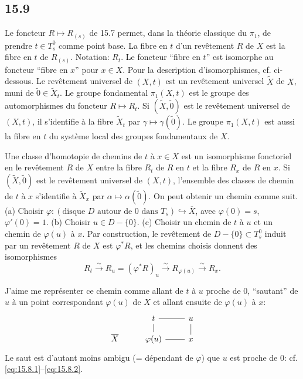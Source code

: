 \documentclass[12pt,a4paper]{article}
\theoremstyle{plain}
\theoremstyle{definition}
\theoremstyle{remark}
\begin{document}
\subsection*{15.9}

Le foncteur $R \mapsto R_{(s)}$ de 15.7 permet, dans la théorie classique du $\pi_1$, de prendre $t \in T_s^0$ comme point base. La fibre en $t$ d'un revêtement $R$ de $X$ est la fibre en $t$ de $R_{(s)}$. Notation: $R_t$. Le foncteur ``fibre en $t$'' est isomorphe au foncteur ``fibre en $x$'' pour $x \in X$. Pour la description d'isomorphismes, cf. ci-dessous. Le revêtement universel de $(X, t)$ est un revêtement universel $\widetilde{X}$ de $X$, muni de $\tilde{0} \in \widetilde{X}_t$. Le groupe fondamental $\pi_1(X, t)$ est le groupe des automorphismes du foncteur $R \mapsto R_t$. Si $(\widetilde{X}, \tilde{0})$ est le revêtement universel de $(X, t)$, il s'identifie à la fibre $\widetilde{X}_t$ par $\gamma \mapsto \gamma(\tilde{0})$. Le groupe $\pi_1(X, t)$ est aussi la fibre en $t$ du système local des groupes fondamentaux de $X$.

Une classe d'homotopie de chemins de $t$ à $x \in X$ est un isomorphisme fonctoriel en le revêtement $R$ de $X$ entre la fibre $R_t$ de $R$ en $t$ et la fibre $R_x$ de $R$ en $x$. Si $(\widetilde{X}, \tilde{0})$ est le revêtement universel de $(X, t)$, l'ensemble des classes de chemin de $t$ à $x$ s'identifie à $\widetilde{X}_x$ par $\alpha \mapsto \alpha(\tilde{0})$. On peut obtenir un chemin comme suit. (a) Choisir $\varphi : (\text{disque } D \text{ autour de } 0 \text{ dans } T_s) \hookrightarrow \overline{X}$, avec $\varphi(0) = s$, $\varphi'(0) = 1$. (b) Choisir $u \in D - \{0\}$. (c) Choisir un chemin de $t$ à $u$ et un chemin de $\varphi(u)$ à $x$. Par construction, le revêtement de $D - \{0\} \subset T_s^0$ induit par un revêtement $R$ de $X$ est $\varphi^* R$, et les chemins choisis donnent des isomorphismes
\[
R_t \xrightarrow{\sim} R_u = (\varphi^* R)_u \xrightarrow{\sim} R_{\varphi(u)} \xrightarrow{\sim} R_x.
\]

J'aime me représenter ce chemin comme allant de $t$ à $u$ proche de $0$, ``sautant'' de $u$ à un point correspondant $\varphi(u)$ de $X$ et allant ensuite de $\varphi(u)$ à $x$:
\[
\begin{tikzcd}[row sep=small]
& t \arrow[r, dash] \arrow[d, dash] & u \arrow[d, dash] \\
\overline{X} & \varphi(u) \arrow[r, dash] & x
\end{tikzcd}
\]
Le saut est d'autant moins ambigu (= dépendant de $\varphi$) que $u$ est proche de $0$: cf. \eqref{eq:15.8.1}--\eqref{eq:15.8.2}.
\end{document}
